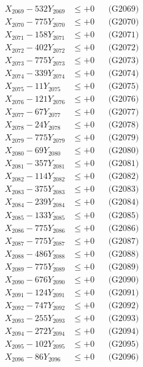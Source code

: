 \documentclass[a4paper,10pt]{article}
\begin{document}
{\begin{align}
X_{2069} - 532Y_{2069} &\leq +0 && \text{(G2069)} \\
X_{2070} - 775Y_{2070} &\leq +0 && \text{(G2070)} \\
\allowbreak
X_{2071} - 158Y_{2071} &\leq +0 && \text{(G2071)} \\
X_{2072} - 402Y_{2072} &\leq +0 && \text{(G2072)} \\
X_{2073} - 775Y_{2073} &\leq +0 && \text{(G2073)} \\
X_{2074} - 339Y_{2074} &\leq +0 && \text{(G2074)} \\
X_{2075} - 11Y_{2075} &\leq +0 && \text{(G2075)} \\
X_{2076} - 121Y_{2076} &\leq +0 && \text{(G2076)} \\
X_{2077} - 67Y_{2077} &\leq +0 && \text{(G2077)} \\
X_{2078} - 24Y_{2078} &\leq +0 && \text{(G2078)} \\
X_{2079} - 775Y_{2079} &\leq +0 && \text{(G2079)} \\
X_{2080} - 69Y_{2080} &\leq +0 && \text{(G2080)} \\
\allowbreak
X_{2081} - 357Y_{2081} &\leq +0 && \text{(G2081)} \\
X_{2082} - 114Y_{2082} &\leq +0 && \text{(G2082)} \\
X_{2083} - 375Y_{2083} &\leq +0 && \text{(G2083)} \\
X_{2084} - 239Y_{2084} &\leq +0 && \text{(G2084)} \\
X_{2085} - 133Y_{2085} &\leq +0 && \text{(G2085)} \\
X_{2086} - 775Y_{2086} &\leq +0 && \text{(G2086)} \\
X_{2087} - 775Y_{2087} &\leq +0 && \text{(G2087)} \\
X_{2088} - 486Y_{2088} &\leq +0 && \text{(G2088)} \\
X_{2089} - 775Y_{2089} &\leq +0 && \text{(G2089)} \\
X_{2090} - 676Y_{2090} &\leq +0 && \text{(G2090)} \\
\allowbreak
X_{2091} - 124Y_{2091} &\leq +0 && \text{(G2091)} \\
X_{2092} - 747Y_{2092} &\leq +0 && \text{(G2092)} \\
X_{2093} - 255Y_{2093} &\leq +0 && \text{(G2093)} \\
X_{2094} - 272Y_{2094} &\leq +0 && \text{(G2094)} \\
X_{2095} - 102Y_{2095} &\leq +0 && \text{(G2095)} \\
X_{2096} - 86Y_{2096} &\leq +0 && \text{(G2096)} \\

\end{align}}
\end{document}
